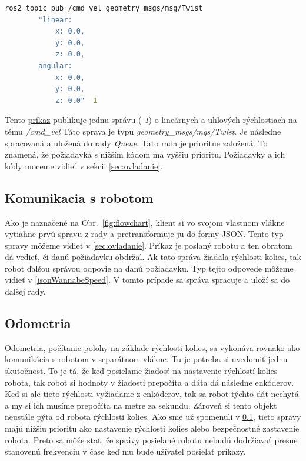 \label{requestCommand}
\begin{lstlisting}[language=bash]
	ros2 topic pub /cmd_vel geometry_msgs/msg/Twist
		"linear:
			x: 0.0,
			y: 0.0,
			z: 0.0,
		angular:
			x: 0.0,
			y: 0.0,
			z: 0.0" -1
\end{lstlisting}

Tento \hyperref[requestCommand]{príkaz} publikuje jednu správu (\textit{-1}) o lineárnych a uhlových rýchlostiach na tému \textit{/cmd\_vel}
Táto sprava je typu \textit{geometry\_msgs/mgs/Twist}. Je následne spracovaná a uložená do rady \textit{Queue}. Tato rada je prioritne založená.
To znamená, že požiadavka s nižším kódom ma vyššiu prioritu. Požiadavky a ich kódy moceme vidieť v sekcii \ref{sec:ovladanie}.

\subsection{Komunikacia s robotom}
\label{sec:robotComms}

Ako je naznačené na Obr.~\ref{fig:flowchart}, klient si vo svojom vlastnom vlákne vytiahne prvú spravu z rady a pretransformuje ju do formy JSON.
Tento typ spravy môžeme vidieť v \ref{sec:ovladanie}. Príkaz je poslaný robotu a ten obratom dá vedieť, či danú požiadavku obdržal. Ak tato správa
žiadala rýchlosti kolies, tak robot ďalšou správou odpovie na danú požiadavku. Typ tejto odpovede môžeme vidieť v \ref{jsonWannabeSpeed}. V tomto prípade
sa správa spracuje a uloží sa do ďalšej rady.

\subsection{Odometria}
\label{sec:odometria}

Odometria, počítanie polohy na základe rýchlosti kolies, sa vykonáva rovnako ako komunikácia s robotom v separátnom vlákne. Tu je potreba si uvedomiť
jednu skutočnosť. To je tá, že keď posielame žiadosť na nastavenie rýchlostí kolies robota, tak robot si hodnoty v žiadosti prepočíta a dáta dá následne
enkóderov. Keď si ale tieto rýchlosti vyžiadame z enkóderov, tak sa robot týchto dát nechytá a my si ich musíme prepočíta na metre za sekundu. Zároveň
si tento objekt neustále pýta od robota rýchlosti kolies. Ako sme už spomenuli v \ref{sec:robotComms}, tieto spravy majú nižšiu prioritu ako nastavenie
rýchlosti kolies alebo bezpečnostné zastavenie robota. Preto sa môže stat, že správy posielané robotu nebudú dodržiavať presne stanovenú frekvenciu v čase
keď mu bude užívateľ posielať príkazy.

